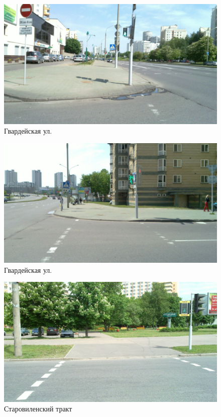 \documentclass[a4paper,14pt,twoside]{extarticle}
\begin{document}
\begin{figure}[h!]
    \centering
    \includegraphics[width=\textwidth]{Pictures/1000000000000A00000005A069334A79.jpg}
    \caption{Гвардейская ул.}
\end{figure}

\begin{figure}[h!]
    \centering
    \includegraphics[width=\textwidth]{Pictures/1000000000000A00000005A02C4E92DF.jpg}
    \caption{Гвардейская ул.}
\end{figure}

\begin{figure}[h!]
    \centering
    \includegraphics[width=\textwidth]{Pictures/1000000000000A00000005A0C349AD32.jpg}
    \caption{Старовиленский тракт}
\end{figure}
\end{document}
